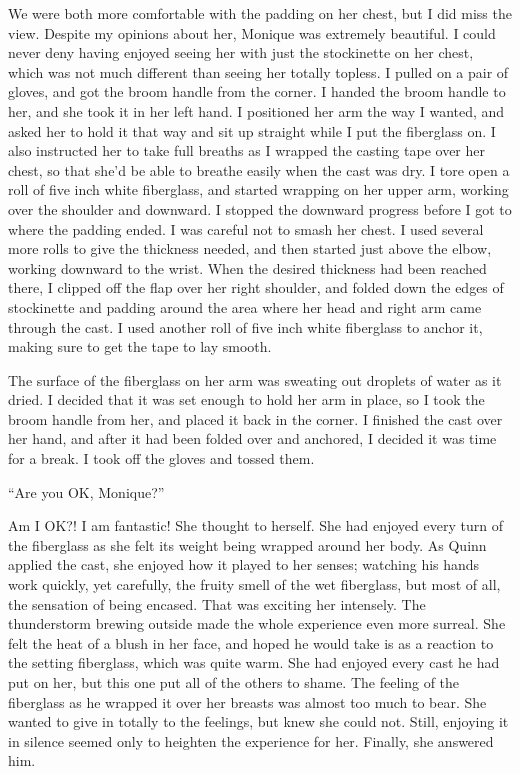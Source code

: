 We were both more comfortable with the padding on her chest, but I did miss the view.
Despite my opinions about her, Monique was extremely beautiful. I could never deny having
enjoyed seeing her with just the stockinette on her chest, which was not much different than
seeing her totally topless. I pulled on a pair of gloves, and got the broom handle from the
corner. I handed the broom handle to her, and she took it in her left hand. I positioned her arm
the way I wanted, and asked her to hold it that way and sit up straight while I put the
fiberglass on. I also instructed her to take full breaths as I wrapped the casting tape over her
chest, so that she'd be able to breathe easily when the cast was dry. I tore open a roll of five
inch white fiberglass, and started wrapping on her upper arm, working over the shoulder and
downward. I stopped the downward progress before I got to where the padding ended. I was careful
not to smash her chest. I used several more rolls to give the thickness needed, and then started
just above the elbow, working downward to the wrist. When the desired thickness had been reached
there, I clipped off the flap over her right shoulder, and folded down the edges of stockinette
and padding around the area where her head and right arm came through the cast. I used another
roll of five inch white fiberglass to anchor it, making sure to get the tape to lay smooth.

The surface of the fiberglass on her arm was sweating out droplets of water as it dried. I
decided that it was set enough to hold her arm in place, so I took the broom handle from her,
and placed it back in the corner. I finished the cast over her hand, and after it had been
folded over and anchored, I decided it was time for a break. I took off the gloves and tossed
them.

``Are you OK, Monique?''

\begin{thought}
Am I OK?! I am fantastic! She thought to herself. She had enjoyed every turn of the
fiberglass as she felt its weight being wrapped around her body. As Quinn applied the cast, she
enjoyed how it played to her senses; watching his hands work quickly, yet carefully, the fruity
smell of the wet fiberglass, but most of all, the sensation of being encased. That was exciting
her intensely. The thunderstorm brewing outside made the whole experience even more surreal. She
felt the heat of a blush in her face, and hoped he would take is as a reaction to the setting
fiberglass, which was quite warm. She had enjoyed every cast he had put on her, but this one put
all of the others to shame. The feeling of the fiberglass as he wrapped it over her breasts was
almost too much to bear. She wanted to give in totally to the feelings, but knew she could not.
Still, enjoying it in silence seemed only to heighten the experience for her. Finally, she
answered him.
\end{thought}

